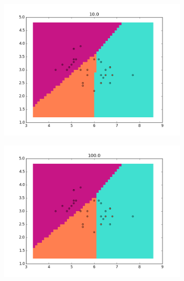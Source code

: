 \documentclass{article}
\begin{document}
\begin{center}
\begin{figure}
\centering
        \begin{subfigure}[b]{0.48\textwidth}
                \centering
                \includegraphics[width=\linewidth]{figure_5}
        \end{subfigure}\hfill
        \begin{subfigure}[b]{0.48\textwidth}
                \centering
                \includegraphics[width=\linewidth]{figure_6}
        \end{subfigure}\hfill
        \label{fig:3}
 \end{figure}
       

\end{center}
\end{document}

